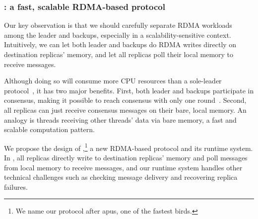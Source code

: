 \vspace{-.15in}\subsubsection{\falcon: a fast, scalable RDMA-based \paxos 
protocol} 
\label{sec:falcon}\vspace{-.075in}

Our key observation is that we should carefully separate RDMA workloads among
the leader and backups, especially in a scalability-sensitive context. 
Intuitively, we can let both leader and backups do RDMA writes directly on 
destination replicas' memory, and let all replicas poll their local memory to 
receive messages.

Although doing so will consume more CPU resources than a sole-leader 
protocol~\cite{dare:hpdc15}, it has two major benefits. First, both leader and 
backups participate in consensus, making it possible to reach consensus 
with only one round~\cite{paxos:practical}. Second, all replicas can just 
receive consensus messages on their bare, local memory. An analogy is threads 
receiving other threads' data via bare memory, a fast and scalable computation 
pattern.

We propose the design of \falcon,\footnote{We name our protocol after
apus, one of the fastest birds.} a new RDMA-based \paxos protocol and its
runtime system. In \xxx, all replicas directly write to destination
replicas' memory and poll messages from local memory to receive messages, and 
our runtime system handles other technical challenges such as checking message 
delivery and recovering replica failures.

